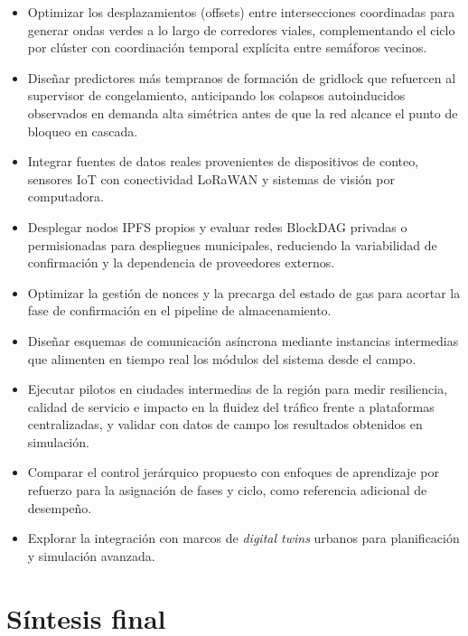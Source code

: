 \begin{itemize}
  \item Optimizar los desplazamientos (offsets) entre intersecciones coordinadas para
        generar ondas verdes a lo largo de corredores viales, complementando el ciclo por
        clúster con coordinación temporal explícita entre semáforos vecinos.
  \item Diseñar predictores más tempranos de formación de gridlock que refuercen al
        supervisor de congelamiento, anticipando los colapsos autoinducidos observados en
        demanda alta simétrica antes de que la red alcance el punto de bloqueo en cascada.
  \item Integrar fuentes de datos reales provenientes de dispositivos de conteo, sensores IoT
        con conectividad LoRaWAN y sistemas de visión por computadora.
  \item Desplegar nodos IPFS propios y evaluar redes BlockDAG privadas o permisionadas para
        despliegues municipales, reduciendo la variabilidad de confirmación y la dependencia
        de proveedores externos.
  \item Optimizar la gestión de nonces y la precarga del estado de gas para acortar la fase de
        confirmación en el pipeline de almacenamiento.
  \item Diseñar esquemas de comunicación asíncrona mediante instancias intermedias que alimenten
        en tiempo real los módulos del sistema desde el campo.
  \item Ejecutar pilotos en ciudades intermedias de la región para medir resiliencia, calidad de
        servicio e impacto en la fluidez del tráfico frente a plataformas centralizadas, y
        validar con datos de campo los resultados obtenidos en simulación.
  \item Comparar el control jerárquico propuesto con enfoques de aprendizaje por refuerzo
        para la asignación de fases y ciclo, como referencia adicional de desempeño.
  \item Explorar la integración con marcos de \textit{digital twins} urbanos para planificación
        y simulación avanzada.
\end{itemize}

\section{Síntesis final}

